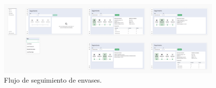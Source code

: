 \begin{figure}[!htb]
	\centering
	\includegraphics[width=\linewidth]{Figures/flow-tracking.png}
	\caption{Flujo de seguimiento de envases.}
  \label{fig:flow-tracking}
\end{figure}